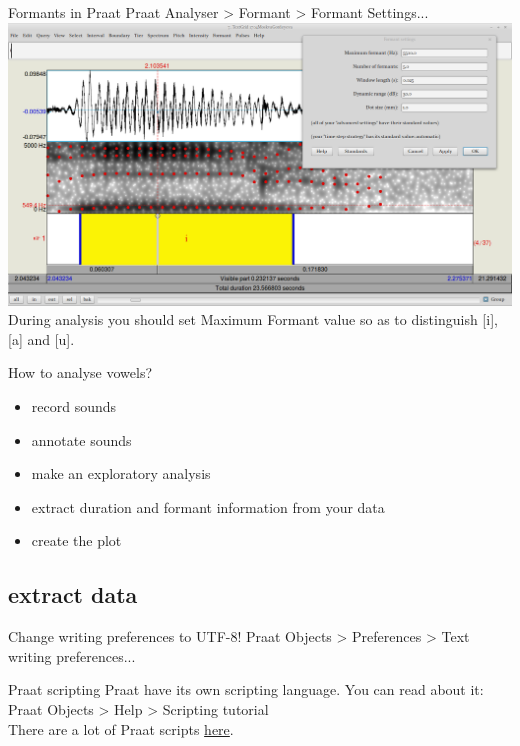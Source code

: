 \begin{frame}{Formants in Praat}
Praat Analyser > Formant > Formant Settings...\\
\includegraphics[width=\linewidth]{05-formnats.png}\\
During analysis you should set Maximum Formant value  so as to distinguish [i], [a] and [u].
\end{frame}

\begin{frame}{How to analyse vowels?}
\begin{itemize}
\item[\checkmark] record sounds
\item[\checkmark] annotate sounds
\item[\checkmark] make an exploratory analysis
\item extract duration and formant information from your data
\item create the plot
\end{itemize}
\end{frame}

\subsection{extract data}
\begin{frame}{Change writing preferences to UTF-8!}
Praat Objects > Preferences > Text writing preferences...
\end{frame}

\begin{frame}{Praat scripting}
Praat have its own scripting language. You can read about it:\\
Praat Objects > Help > Scripting tutorial\\
There are  a lot of Praat scripts \href{http://phonetics.linguistics.ucla.edu/facilities/acoustic/praat.html}{here}.
\end{frame}

